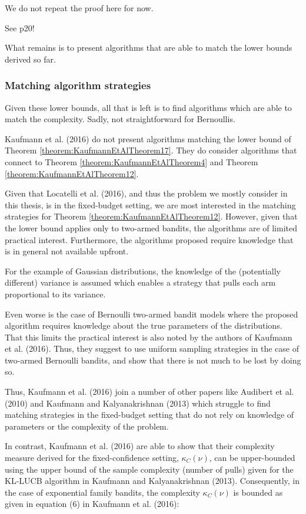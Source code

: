 \documentclass[12pt,]{article}
\begin{document}
We do not repeat the proof here for now.

See p20!

What remains is to present algorithms that are able to match the lower
bounds derived so far.

\subsubsection{Matching algorithm
strategies}\label{matching-algorithm-strategies}

Given these lower bounds, all that is left is to find algorithms which
are able to match the complexity. Sadly, not straightforward for
Bernoullis.

Kaufmann et al. (2016) do not present algorithms matching the lower
bound of Theorem \ref{theorem:KaufmannEtAlTheorem17}. They do consider
algorithms that connect to Theorem \ref{theorem:KaufmannEtAlTheorem4}
and Theorem \ref{theorem:KaufmannEtAlTheorem12}.

Given that Locatelli et al. (2016), and thus the problem we mostly
consider in this thesis, is in the fixed-budget setting, we are most
interested in the matching strategies for Theorem
\ref{theorem:KaufmannEtAlTheorem12}. However, given that the lower bound
applies only to two-armed bandits, the algorithms are of limited
practical interest. Furthermore, the algorithms proposed require
knowledge that is in general not available upfront.

For the example of Gaussian distributions, the knowledge of the
(potentially different) variance is assumed which enables a strategy
that pulls each arm proportional to its variance.

Even worse is the case of Bernoulli two-armed bandit models where the
proposed algorithm requires knowledge about the true parameters of the
distributions. That this limits the practical interest is also noted by
the authors of Kaufmann et al. (2016). Thus, they suggest to use uniform
sampling strategies in the case of two-armed Bernoulli bandits, and show
that there is not much to be lost by doing so.

Thus, Kaufmann et al. (2016) join a number of other papers like Audibert
et al. (2010) and Kaufmann and Kalyanakrishnan (2013) which struggle to
find matching strategies in the fixed-budget setting that do not rely on
knowledge of parameters or the complexity of the problem.

In contrast, Kaufmann et al. (2016) are able to show that their
complexity measure derived for the fixed-confidence setting,
\(\kappa_C(\nu)\), can be upper-bounded using the upper bound of the
sample complexity (number of pulls) given for the KL-LUCB algorithm in
Kaufmann and Kalyanakrishnan (2013). Consequently, in the case of
exponential family bandits, the complexity \(\kappa_C(\nu)\) is bounded
as given in equation (6) in Kaufmann et al. (2016):
\end{document}
